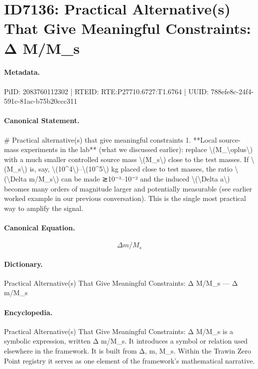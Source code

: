 \section*{ID7136: Practical Alternative(s) That Give Meaningful Constraints: Δ M/M\_s}
\paragraph{Metadata.}
PiID: 2083760112302 | RTEID: RTE:P27710.6727:T1.6764 | UUID: 788efe8c-24f4-591c-81ac-b75b20ccc311

\paragraph{Canonical Statement.}
\# Practical alternative(s) that give meaningful constraints 1. **Local source-mass experiments in the lab** (what we discussed earlier): replace \textbackslash{}(M\_\textbackslash{}oplus\textbackslash{}) with a much smaller controlled source mass \textbackslash{}(M\_s\textbackslash{}) close to the test masses. If \textbackslash{}(M\_s\textbackslash{}) is, say, \textbackslash{}(10\textasciicircum{}4\textbackslash{})–\textbackslash{}(10\textasciicircum{}5\textbackslash{}) kg placed close to test masses, the ratio \textbackslash{}(\textbackslash{}Delta m/M\_s\textbackslash{}) can be made ≳10⁻³–10⁻² and the induced \textbackslash{}(\textbackslash{}Delta a\textbackslash{}) becomes many orders of magnitude larger and potentially measurable (see earlier worked example in our previous conversation). This is the single most practical way to amplify the signal.

\paragraph{Canonical Equation.}
\[
\Delta m/M_s
\]

\paragraph{Dictionary.}
Practical Alternative(s) That Give Meaningful Constraints: Δ M/M\_s — Δ m/M\_s

\paragraph{Encyclopedia.}
Practical Alternative(s) That Give Meaningful Constraints: Δ M/M\_s is a symbolic expression, written Δ m/M\_s. It introduces a symbol or relation used elsewhere in the framework. It is built from Δ, m, M\_s. Within the Trawin Zero Point registry it serves as one element of the framework's mathematical narrative.
